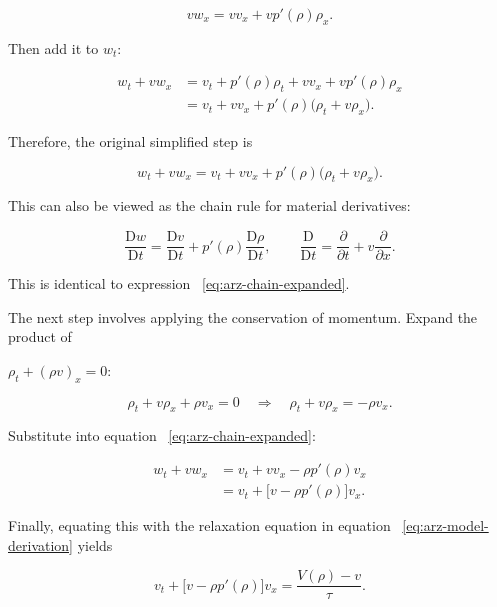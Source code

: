 \documentclass[11pt,a4paper,openany]{book}
\numberwithin{equation}{chapter}
\numberwithin{figure}{chapter}
\numberwithin{table}{chapter}
\begin{document}
\begin{equation}
vw_x=vv_x+vp'(\rho)\rho_x.
\end{equation}

Then add it to $w_t$:

\begin{align}
w_t+vw_x
&=v_t+p'(\rho)\rho_t+vv_x+vp'(\rho)\rho_x\\
&=v_t+vv_x+p'(\rho)\bigl(\rho_t+v\rho_x\bigr).
\label{eq:arz-chain-expanded}
\end{align}

Therefore, the original simplified step is

\begin{equation}
w_t+vw_x
=v_t+vv_x+p'(\rho)\bigl(\rho_t+v\rho_x\bigr).
\label{eq:arz-material-chain}
\end{equation}




This can also be viewed as the chain rule for material derivatives:

\begin{equation}
\frac{\mathrm Dw}{\mathrm Dt}
=\frac{\mathrm Dv}{\mathrm Dt}
+p'(\rho)\frac{\mathrm D\rho}{\mathrm Dt},
\qquad
\frac{\mathrm D}{\mathrm Dt}
=\frac{\partial}{\partial t}
+v\frac{\partial}{\partial x}.
\label{eq:arz-material-compact}
\end{equation}

This is identical to expression ~\eqref{eq:arz-chain-expanded}.




The next step involves applying the conservation of momentum. Expand the product of

$\rho_t+(\rho v)_x=0$:

\begin{equation}
\rho_t+v\rho_x+\rho v_x=0
\quad\Longrightarrow\quad
\rho_t+v\rho_x=-\rho v_x.
\label{eq:arz-continuity-substitution}
\end{equation}

Substitute into equation ~\eqref{eq:arz-chain-expanded}:

\begin{align}
w_t+vw_x
&=v_t+vv_x-\rho p'(\rho)v_x\\
&=v_t+\bigl[v-\rho p'(\rho)\bigr]v_x.
\label{eq:arz-speed-left-detail}
\end{align}

Finally, equating this with the relaxation equation in equation ~\eqref{eq:arz-model-derivation} yields

\begin{equation}
\boxed{
v_t+\bigl[v-\rho p'(\rho)\bigr]v_x
=\frac{V(\rho)-v}{\tau}.}
\label{eq:arz-speed-model-derivation}
\end{equation}
\end{document}
